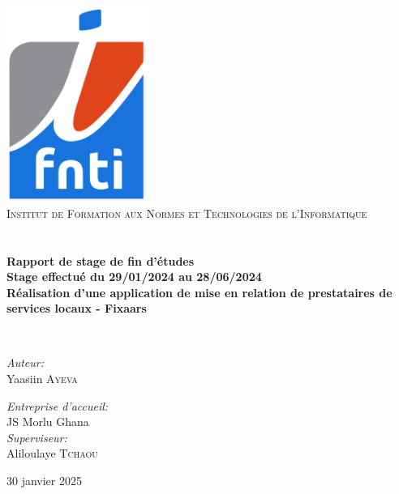 \begin{titlepage}
\begin{center}

\includegraphics[width=0.35\textwidth]{assets/presentation/ifnti}~\\[1cm]

{\fontsize{13.5pt}{10pt}\selectfont
\textsc{Institut de Formation aux Normes et Technologies de l'Informatique}
}\\[1cm]

\textsc{\Large }\\[0.5cm]

\HRule \\[0.4cm]

{\huge \bfseries 
Rapport de stage de fin d’études \\ Stage effectué du 29/01/2024 au 28/06/2024 \\
Réalisation d’une application de mise en relation de prestataires de services locaux - Fixaars\\[0.4cm] }


\HRule \\[1.5cm]

\begin{minipage}{0.4\textwidth}
\begin{flushleft} \large
\emph{Auteur:}\\
Yaasiin \textsc{Ayeva}\\
\end{flushleft}
\end{minipage}
\begin{minipage}{0.4\textwidth}
\begin{flushright} \large
\emph{Entreprise d'accueil:} \\
JS Morlu Ghana \textsc{}\\
\emph{Superviseur:} \\
Aliloulaye \textsc{Tchaou}
\end{flushright}
\end{minipage}

\vfill

{\large 30 janvier 2025}

\end{center}
\end{titlepage}